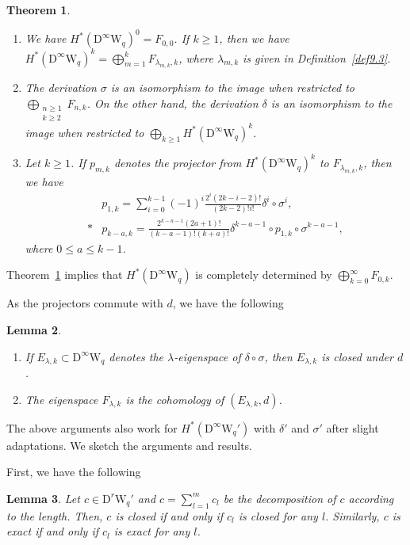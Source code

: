 \documentclass[12pt]{amsart}
\newcommand{\W}{\mathrm{W}}
\newcommand{\D}{\mathrm{D}}
\newtheorem{theorem}{Theorem}[section]
\newtheorem{lemma}[theorem]{Lemma}
\theoremstyle{definition}
\theoremstyle{remark}
\begin{document}
\begin{theorem}
\label{structure}
\begin{enumerate}
\item[\textup{1)}]
We have $H^*(\D^\infty\W_q)^0=F_{0,0}$.
If $k\geq1$, then we have $H^*(\D^\infty\W_q)^k=\bigoplus_{m=1}^kF_{\lambda_{m,k},k}$, where $\lambda_{m,k}$ is given in Definition~\ref{def9.3}.
\item[\textup{2)}]
The derivation $\sigma$ is an isomorphism to the image when restricted to $\bigoplus_{\substack{n\geq1\\ k\geq2}}F_{n,k}$.
On the other hand, the derivation $\delta$ is an isomorphism to the image when restricted to $\bigoplus_{k\geq1}H^*(\D^\infty\W_q)^k$.
\item[\textup{3)}]
Let $k\geq1$.
If $p_{m,k}$ denotes the projector from $H^*(\D^\infty\W_q)^k$ to $F_{\lambda_{m,k},k}$, then we have
\begin{align*}
&p_{1,k}=\sum_{i=0}^{k-1}(-1)^i\frac{2^i(2k-i-2)!}{(2k-2)!i!}\delta^i\circ\sigma^i,\\*
&p_{k-a,k}=\frac{2^{k-a-1}(2a+1)!}{(k-a-1)!(k+a)!}\delta^{k-a-1}\circ p_{1,k}\circ\sigma^{k-a-1},
\end{align*}
where $0\leq a\leq k-1$.
\end{enumerate}
\end{theorem}

Theorem~\ref{structure} implies that $H^*(\D^\infty\W_q)$ is completely determined by $\bigoplus_{k=0}^{\infty}F_{0,k}$.

As the projectors commute with $d$, we have the following
\begin{lemma}
\begin{enumerate}
\item[\textup{1)}]
If $E_{\lambda,k}\subset\D^\infty\W_q$ denotes the $\lambda$-eigenspace of $\delta\circ\sigma$, then $E_{\lambda,k}$ is closed under $d$.
\item[\textup{2)}]
The eigenspace $F_{\lambda,k}$ is the cohomology of $(E_{\lambda,k},d)$.
\end{enumerate}
\end{lemma}

The above arguments also work for $H^*(\D^\infty\W_q')$ with $\delta'$ and $\sigma'$ after slight adaptations.
We sketch the arguments and results.

First, we have the following

\begin{lemma}
Let $c\in\D^r\W_q'$ and $c=\sum_{l=1}^mc_l$ be the decomposition of $c$ according to the length.
Then, $c$ is closed if and only if $c_l$ is closed for any $l$.
Similarly, $c$ is exact if and only if $c_l$ is exact for any $l$.
\end{lemma}
\end{document}
